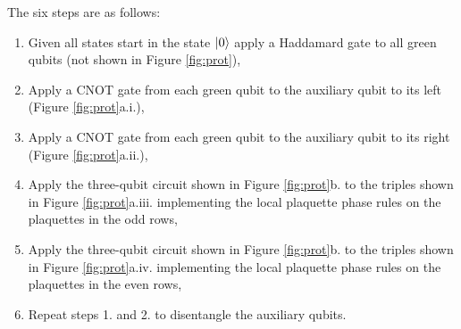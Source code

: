 \documentclass[a4paper,twocolumn,11pt]{quantumarticle}
\begin{document}
The six steps are as follows:\begin{enumerate}
\item Given all states start in the state $\ket{0}$ apply a Haddamard gate to all green qubits (not shown in Figure \ref{fig:prot}),
\item Apply a CNOT gate from each green qubit to the auxiliary qubit to its left (Figure \ref{fig:prot}a.i.),
\item Apply a CNOT gate from each green qubit to the auxiliary qubit to its right (Figure \ref{fig:prot}a.ii.),
\item Apply the three-qubit circuit shown in Figure \ref{fig:prot}b. to the triples shown in Figure \ref{fig:prot}a.iii. implementing the local plaquette phase rules on the plaquettes in the odd rows,
\item Apply the three-qubit circuit shown in Figure \ref{fig:prot}b. to the triples shown in Figure \ref{fig:prot}a.iv. implementing the local plaquette phase rules on the plaquettes in the even rows,
\item Repeat steps 1. and 2. to disentangle the auxiliary qubits.
\end{enumerate}






\end{document}
